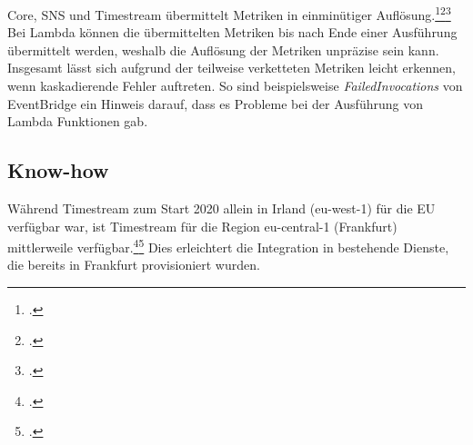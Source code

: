 \AWSIOT{} Core, \ac{SNS} und Timestream übermittelt Metriken in einminütiger Auflösung.\footcite[Vgl.][]{AmazonWebServicesInc..o.J.az}\nzitat\footcite[Vgl.][]{AmazonWebServicesInc..2021b}\nzitat\footcite[Vgl.][]{AmazonWebServicesInc..o.J.be} 
Bei Lambda können die übermittelten Metriken bis nach Ende einer Ausführung übermittelt werden, weshalb die Auflösung der Metriken unpräzise sein kann. Insgesamt lässt sich aufgrund der teilweise verketteten Metriken leicht erkennen, wenn kaskadierende Fehler auftreten. So sind beispielsweise \textit{FailedInvocations} von EventBridge ein Hinweis darauf, dass es Probleme bei der Ausführung von Lambda Funktionen gab.



\subsection{Know-how}
Während Timestream zum Start 2020 allein in Irland (eu-west-1) für die EU verfügbar war, ist Timestream für die Region eu-central-1 (Frankfurt) mittlerweile verfügbar.\footcite[Vgl.][]{AmazonWebServicesInc..2020g}\nzitat\footcite[Vgl.][]{AmazonWebServicesInc..o.J.q} Dies erleichtert die Integration in bestehende Dienste, die bereits in Frankfurt provisioniert wurden.


